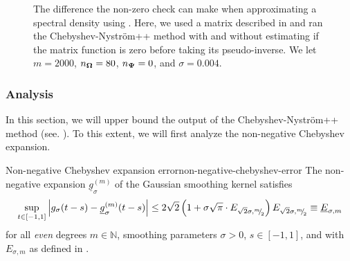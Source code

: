 \documentclass[12pt]{article}
\begin{document}
\begin{figure}[ht]
    \centering
    
    \caption{The difference the non-zero check can make when approximating a spectral density using . Here, we used a matrix described in  and ran the Chebyshev-Nyström++ method with and without estimating if the matrix function is zero before taking its pseudo-inverse. We let $m=2000$, $n_{\boldsymbol{\Omega}}=80$, $n_{\boldsymbol{\Psi}}=0$, and $\sigma = 0.004$.}
    \label{fig:zerocheck}
\end{figure}

\subsubsection{Analysis}
\label{subsubsec:chebyshev-nystrom-analysis}

In this section, we will upper bound the output of the Chebyshev-Nyström++ method (see. ). To this extent, we will first analyze the non-negative Chebyshev expansion.

\begin{lemma}{Non-negative Chebyshev expansion error}{non-negative-chebyshev-error}
    The non-negative expansion $\underline{g}_{\sigma}^{(m)}$ of the Gaussian smoothing kernel satisfies
    \begin{equation}
        \sup_{t \in [-1, 1]} \left| g_{\sigma}(t - s) - \underline{g}_{\sigma}^{(m)}(t - s) \right| \leq 2\sqrt{2} \left(1 + \sigma \sqrt{\pi} \cdot E_{\sqrt{2}\sigma, {}^{m}{\mskip -5mu/\mskip -3mu}_{2}}\right) E_{\sqrt{2}\sigma, {}^{m}{\mskip -5mu/\mskip -3mu}_{2}} \equiv \underline{E}_{\sigma, m}
        \label{equ:chebyshev-interpolation-sup-error-kernel-nonneg}
    \end{equation}
    for all \emph{even} degrees $m \in \mathbb{N}$, smoothing parameters $\sigma > 0$, $s \in [-1, 1]$, and with $E_{\sigma, m}$ as defined in .
\end{lemma}
\end{document}
